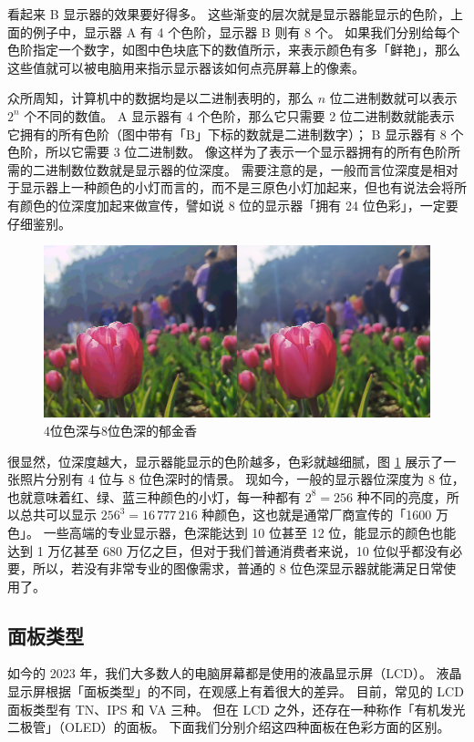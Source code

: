 看起来 B 显示器的效果要好得多。
这些渐变的层次就是显示器能显示的色阶，上面的例子中，显示器 A 有 4 个色阶，显示器 B 则有 8 个。
如果我们分别给每个色阶指定一个数字，如图中色块底下的数值所示，来表示颜色有多「鲜艳」，那么这些值就可以被电脑用来指示显示器该如何点亮屏幕上的像素。

众所周知，计算机中的数据均是以二进制表明的，那么 $n$ 位二进制数就可以表示 $2^n$ 个不同的数值。
A 显示器有 4 个色阶，那么它只需要 2 位二进制数就能表示它拥有的所有色阶（图中带有「B」下标的数就是二进制数字）；
B 显示器有 8 个色阶，所以它需要 3 位二进制数。
像这样为了表示一个显示器拥有的所有色阶所需的二进制数位数就是显示器的位深度。
需要注意的是，一般而言位深度是相对于显示器上一种颜色的小灯而言的，而不是三原色小灯加起来，但也有说法会将所有颜色的位深度加起来做宣传，譬如说 8 位的显示器「拥有 24 位色彩」，一定要仔细鉴别。

\begin{figure}[htb!]
  \centering
  \includegraphics[width=.8\textwidth]{assets/4bit_vs_8bit.png}
  \caption{4位色深与8位色深的郁金香}
  \label{4bit_vs_8bit}
\end{figure}

很显然，位深度越大，显示器能显示的色阶越多，色彩就越细腻，图 \ref{4bit_vs_8bit} 展示了一张照片分别有 4 位与 8 位色深时的情景。
现如今，一般的显示器位深度为 8 位，也就意味着红、绿、蓝三种颜色的小灯，每一种都有 $2^8 = 256$ 种不同的亮度，所以总共可以显示 $256^3 = 16\,777\,216$ 种颜色，这也就是通常厂商宣传的「1600 万色」。
一些高端的专业显示器，色深能达到 10 位甚至 12 位，能显示的颜色也能达到 1 万亿甚至 680 万亿之巨，但对于我们普通消费者来说，10 位似乎都没有必要，所以，若没有非常专业的图像需求，普通的 8 位色深显示器就能满足日常使用了。

\subsection{面板类型}

如今的 2023 年，我们大多数人的电脑屏幕都是使用的液晶显示屏（LCD）。
液晶显示屏根据「面板类型」的不同，在观感上有着很大的差异。
目前，常见的 LCD 面板类型有 TN、IPS 和 VA 三种。
但在 LCD 之外，还存在一种称作「有机发光二极管」（OLED）的面板。
下面我们分别介绍这四种面板在色彩方面的区别。

